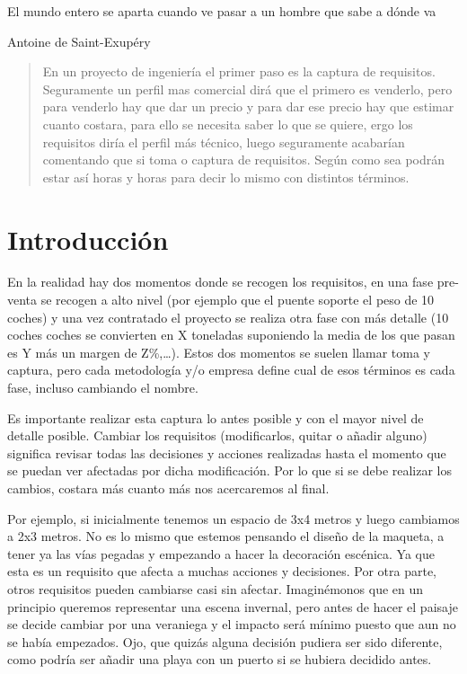 
\epigraph{El mundo entero se aparta cuando ve pasar a un hombre que sabe a dónde va}{Antoine de Saint-Exupéry }

\begin{abstract}
    En un proyecto de ingeniería el primer paso es la captura de requisitos.
    Seguramente un perfil mas comercial dirá que el primero es venderlo, pero para venderlo hay que dar un precio
    y para dar ese precio hay que estimar cuanto costara, para ello se necesita saber lo que se quiere,
    ergo los requisitos diría el perfil más técnico, luego seguramente acabarían comentando que si toma o captura
    de requisitos. Según como sea podrán estar así horas y horas para decir lo mismo con distintos términos.
\end{abstract}

\section{Introducción}

En la realidad hay dos momentos donde se recogen los requisitos, en una fase pre-venta se recogen a alto nivel
(por ejemplo que el puente soporte el peso de 10 coches) y una vez contratado el proyecto se realiza otra fase con
más detalle (10 coches coches se convierten en X toneladas suponiendo la media de los que pasan es Y más un margen
de Z\%,…).
Estos dos momentos se suelen llamar toma y captura, pero cada metodología y/o empresa define cual de esos términos
es cada fase, incluso cambiando el nombre.

Es importante realizar esta captura lo antes posible y con el mayor nivel de detalle posible.
Cambiar los requisitos (modificarlos, quitar o añadir alguno) significa revisar todas las decisiones y acciones
realizadas hasta el momento que se puedan ver afectadas por dicha modificación.
Por lo que si se debe realizar los cambios, costara más cuanto más nos acercaremos al final.

Por ejemplo, si inicialmente tenemos un espacio de 3x4 metros y luego cambiamos a 2x3 metros.
No es lo mismo que estemos pensando el diseño de la maqueta, a tener ya las vías pegadas y empezando a hacer
la decoración escénica. Ya que esta es un requisito que afecta a muchas acciones y decisiones.
Por otra parte, otros requisitos pueden cambiarse casi sin afectar.
Imaginémonos que en un principio queremos representar una escena invernal, pero antes de hacer el paisaje se
decide cambiar por una veraniega y el impacto será mínimo puesto que aun no se había empezados.
Ojo, que quizás alguna decisión pudiera ser sido diferente, como podría ser añadir una playa con un puerto
si se hubiera decidido antes.

